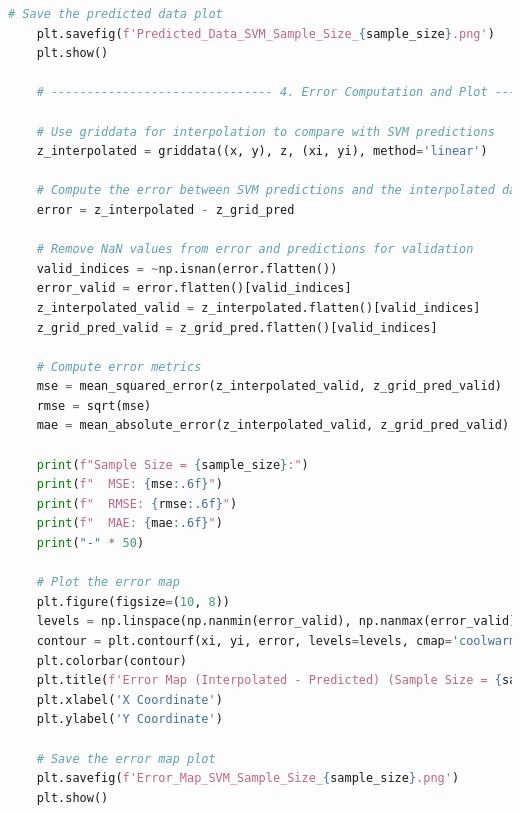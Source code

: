 \documentclass{swmcmthesis}
\begin{document}
\begin{lstlisting}[language=python,caption={The python programme for Problem 3 - Machine Learning}]
    # Save the predicted data plot
    plt.savefig(f'Predicted_Data_SVM_Sample_Size_{sample_size}.png')
    plt.show()

    # ------------------------------- 4. Error Computation and Plot ------------------------------- #

    # Use griddata for interpolation to compare with SVM predictions
    z_interpolated = griddata((x, y), z, (xi, yi), method='linear')

    # Compute the error between SVM predictions and the interpolated data
    error = z_interpolated - z_grid_pred

    # Remove NaN values from error and predictions for validation
    valid_indices = ~np.isnan(error.flatten())
    error_valid = error.flatten()[valid_indices]
    z_interpolated_valid = z_interpolated.flatten()[valid_indices]
    z_grid_pred_valid = z_grid_pred.flatten()[valid_indices]

    # Compute error metrics
    mse = mean_squared_error(z_interpolated_valid, z_grid_pred_valid)
    rmse = sqrt(mse)
    mae = mean_absolute_error(z_interpolated_valid, z_grid_pred_valid)

    print(f"Sample Size = {sample_size}:")
    print(f"  MSE: {mse:.6f}")
    print(f"  RMSE: {rmse:.6f}")
    print(f"  MAE: {mae:.6f}")
    print("-" * 50)

    # Plot the error map
    plt.figure(figsize=(10, 8))
    levels = np.linspace(np.nanmin(error_valid), np.nanmax(error_valid), 20)
    contour = plt.contourf(xi, yi, error, levels=levels, cmap='coolwarm')  
    plt.colorbar(contour) 
    plt.title(f'Error Map (Interpolated - Predicted) (Sample Size = {sample_size})')
    plt.xlabel('X Coordinate')
    plt.ylabel('Y Coordinate')

    # Save the error map plot
    plt.savefig(f'Error_Map_SVM_Sample_Size_{sample_size}.png')
    plt.show()
\end{lstlisting}
\end{document}
